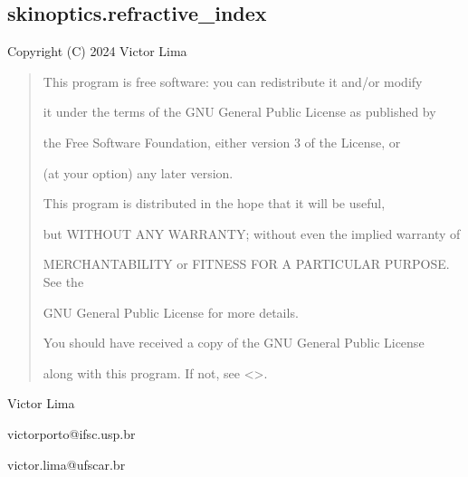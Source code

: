 \documentclass[letterpaper,10pt,english]{sphinxmanual}
\begin{document}
\subsection{skinoptics.refractive\_index}
\label{\detokenize{05_refractive_index:module-skinoptics.refractive_index}}\label{\detokenize{05_refractive_index:skinoptics-refractive-index}}\label{\detokenize{05_refractive_index::doc}}
\sphinxAtStartPar
Copyright (C) 2024 Victor Lima
\begin{quote}

\begin{DUlineblock}{0em}
\item[] This program is free software: you can redistribute it and/or modify
\item[] it under the terms of the GNU General Public License as published by
\item[] the Free Software Foundation, either version 3 of the License, or
\item[] (at your option) any later version.
\end{DUlineblock}

\begin{DUlineblock}{0em}
\item[] This program is distributed in the hope that it will be useful,
\item[] but WITHOUT ANY WARRANTY; without even the implied warranty of
\item[] MERCHANTABILITY or FITNESS FOR A PARTICULAR PURPOSE.  See the
\item[] GNU General Public License for more details.
\end{DUlineblock}

\begin{DUlineblock}{0em}
\item[] You should have received a copy of the GNU General Public License
\item[] along with this program.  If not, see \textless{}\textgreater{}.
\end{DUlineblock}
\end{quote}

\begin{DUlineblock}{0em}
\item[] Victor Lima
\item[] victorporto@ifsc.usp.br
\item[] victor.lima@ufscar.br
\end{DUlineblock}
\end{document}
